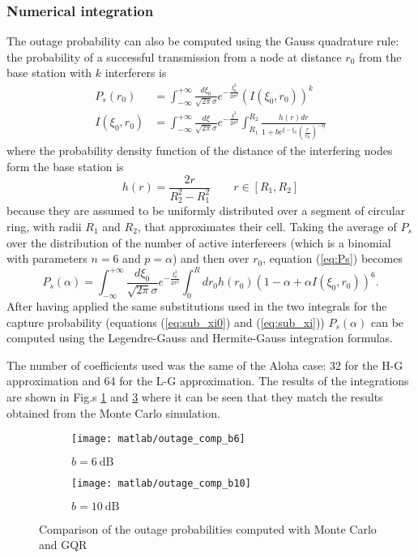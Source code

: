 \documentclass[a4paper,oneside]{article}
\begin{document}
\subsubsection*{Numerical integration}
The outage probability can also be computed using the Gauss quadrature
rule: the probability of a successful transmission from a node at
distance $r_0$ from the base station with $k$ interferers is
\begin{align}
  P_s(r_0) &= \int_{-\infty}^{+\infty} \frac{d\xi_0}{\sqrt{2\pi}\sigma} e^{-\frac{\xi_0^2}{2\sigma^2}}
  \left( I(\xi_0, r_0) \right)^{k}
  \label{eq:Ps} \\
  I(\xi_0, r_0) &= \int_{-\infty}^{+\infty} \frac{d\xi}{\sqrt{2\pi}\sigma} e^{-\frac{\xi^2}{2\sigma^2}}
  \int_{R_1}^{R_2} \frac{h(r)dr}{1 + be^{\xi - \xi_0}\left( \frac{r}{r_0} \right)^{-\eta}}
\end{align}
where the probability density function of the distance of the
interfering nodes form the base station is
\begin{equation}
  h(r) = \frac{2r}{R_2^2 - R_1^2} \qquad r \in [R_1, R_2]
\end{equation}
because they are assumed to be uniformly distributed over a segment of
circular ring, with radii $R_1$ and $R_2$, that approximates their
cell.
%
Taking the average of $P_s$ over the distribution of the number of
active interfereers (which is a binomial with parameters $n=6$ and
$p=\alpha$) and then over $r_0$, equation (\ref{eq:Ps}) becomes
\begin{equation}
  P_s(\alpha) = \int_{-\infty}^{+\infty} \frac{d\xi_0}{\sqrt{2\pi}\sigma} e^{-\frac{\xi_0^2}{2\sigma^2}}
  \int_0^R dr_0 h(r_0) 
  \left( 1-\alpha+ \alpha I(\xi_0, r_0) \right)^{6} .
\end{equation}
After having applied the same substitutions used in the two integrals
for the capture probability (equations (\ref{eq:sub_xi0}) and
(\ref{eq:sub_xi})) $P_s(\alpha)$ can be computed using the
Legendre-Gauss and Hermite-Gauss integration formulas.

The number of coefficients used was the same of the Aloha case: 32 for
the H-G approximation and 64 for the L-G approximation.
%
The results of the integrations are shown in Fig.s
\ref{plot:outage_comp_b6} and \ref{plot:outage_comp_b10} where it can
be seen that they match the results obtained from the Monte Carlo
simulation.
\begin{figure}[htbp]
  \centering
  \begin{subfigure}{0.5\textwidth}
    \centering
    \texttt{[image: matlab/outage\_comp\_b6]}
    \caption{$ b = \SI{6}{\dB}$}
    \label{plot:outage_comp_b6}
  \end{subfigure}%
  \begin{subfigure}{0.5\textwidth}
    \centering
    \texttt{[image: matlab/outage\_comp\_b10]}
    \caption{$ b = \SI{10}{\dB}$}
    \label{plot:outage_comp_b10}
  \end{subfigure}
  \caption{Comparison of the outage probabilities computed with Monte
    Carlo and GQR}
\end{figure}
\end{document}
